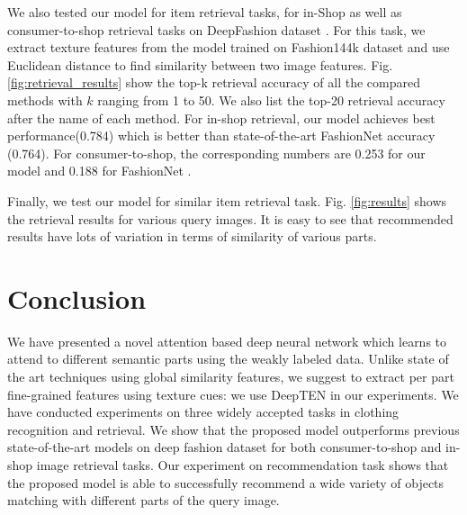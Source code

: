 \documentclass{article}
\begin{document}
We also tested our model for item retrieval tasks, for in-Shop as well as consumer-to-shop retrieval tasks on DeepFashion dataset \cite{LiuCVPR2016}. For this task, we extract texture features from the model trained on Fashion144k dataset \cite{SimoSerraCVPR2016} and use Euclidean distance to find similarity between two image features. Fig. \ref{fig:retrieval_results} show the top-k retrieval accuracy of all the compared methods with $k$ ranging from 1 to 50. We also list the top-20 retrieval accuracy after the name of each method.  For in-shop retrieval, our model achieves best performance(0.784) which is better than state-of-the-art FashionNet \cite{LiuCVPR2016} accuracy (0.764). For consumer-to-shop, the corresponding numbers are 0.253 for our model and 0.188 for FashionNet \cite{LiuCVPR2016}.

Finally, we test our model for similar item retrieval task. Fig. \ref{fig:results} shows the retrieval results for various query images. It is easy to see that recommended results have lots of variation in terms of similarity of various parts.

\section{Conclusion}

We have presented a novel attention based deep neural network which learns to attend to different semantic parts using the weakly labeled data. Unlike state of the art techniques using global similarity features, we suggest to extract per part fine-grained features using texture cues: we use DeepTEN in our experiments. We have conducted experiments on three widely accepted tasks in clothing recognition and retrieval. We show that the proposed model outperforms previous state-of-the-art models on deep fashion dataset for both consumer-to-shop and in-shop image retrieval tasks. Our experiment on recommendation task shows that the proposed model is able to successfully recommend a wide variety of objects matching with different parts of the query image.



\end{document}
